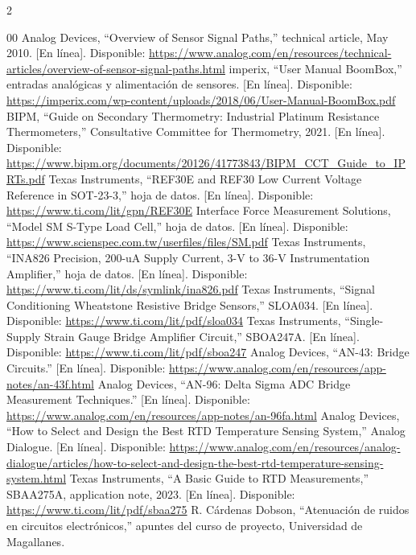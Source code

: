 \documentclass[conference]{IEEEtran}
\begin{document}
\clearpage
\onecolumn
\begin{multicols*}{2}
\begin{thebibliography}{00}
\setlength{\itemsep}{0pt}
\setlength{\parsep}{0pt}
 Analog Devices, ``Overview of Sensor Signal Paths,'' technical article, May 2010. [En línea]. Disponible: \url{https://www.analog.com/en/resources/technical-articles/overview-of-sensor-signal-paths.html}
 imperix, ``User Manual BoomBox,'' entradas analógicas y alimentación de sensores. [En línea]. Disponible: \url{https://imperix.com/wp-content/uploads/2018/06/User-Manual-BoomBox.pdf}
 BIPM, ``Guide on Secondary Thermometry: Industrial Platinum Resistance Thermometers,'' Consultative Committee for Thermometry, 2021. [En línea]. Disponible: \url{https://www.bipm.org/documents/20126/41773843/BIPM_CCT_Guide_to_IPRTs.pdf}
 Texas Instruments, ``REF30E and REF30 Low Current Voltage Reference in SOT-23-3,'' hoja de datos. [En línea]. Disponible: \url{https://www.ti.com/lit/gpn/REF30E}
 Interface Force Measurement Solutions, ``Model SM S-Type Load Cell,'' hoja de datos. [En línea]. Disponible: \url{https://www.scienspec.com.tw/userfiles/files/SM.pdf}
 Texas Instruments, ``INA826 Precision, 200-uA Supply Current, 3-V to 36-V Instrumentation Amplifier,'' hoja de datos. [En línea]. Disponible: \url{https://www.ti.com/lit/ds/symlink/ina826.pdf}
 Texas Instruments, ``Signal Conditioning Wheatstone Resistive Bridge Sensors,'' SLOA034. [En línea]. Disponible: \url{https://www.ti.com/lit/pdf/sloa034}
 Texas Instruments, ``Single-Supply Strain Gauge Bridge Amplifier Circuit,'' SBOA247A. [En línea]. Disponible: \url{https://www.ti.com/lit/pdf/sboa247}
 Analog Devices, ``AN-43: Bridge Circuits.'' [En línea]. Disponible: \url{https://www.analog.com/en/resources/app-notes/an-43f.html}
 Analog Devices, ``AN-96: Delta Sigma ADC Bridge Measurement Techniques.'' [En línea]. Disponible: \url{https://www.analog.com/en/resources/app-notes/an-96fa.html}
 Analog Devices, ``How to Select and Design the Best RTD Temperature Sensing System,'' Analog Dialogue. [En línea]. Disponible: \url{https://www.analog.com/en/resources/analog-dialogue/articles/how-to-select-and-design-the-best-rtd-temperature-sensing-system.html}
 Texas Instruments, ``A Basic Guide to RTD Measurements,'' SBAA275A, application note, 2023. [En línea]. Disponible: \url{https://www.ti.com/lit/pdf/sbaa275}
 R. Cárdenas Dobson, ``Atenuación de ruidos en circuitos electrónicos,'' apuntes del curso de proyecto, Universidad de Magallanes.

\end{thebibliography}
\end{multicols*}
\end{document}
